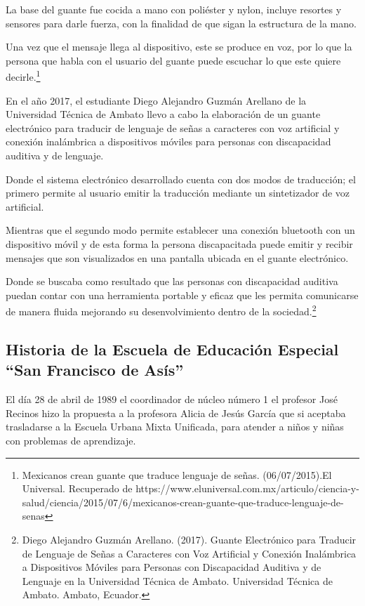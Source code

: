 \documentclass[12pt]{report}%
\begin{document}
La base del guante fue cocida a mano con poliéster y nylon, incluye resortes y sensores para darle fuerza, con la finalidad de que sigan la estructura de la mano. 

Una vez que el mensaje llega al dispositivo, este se produce en voz, por lo que la persona que habla con el usuario del guante puede escuchar lo que este quiere decirle.\footnote{Mexicanos crean guante que traduce lenguaje de señas. (06/07/2015).El Universal. Recuperado de https://www.eluniversal.com.mx/articulo/ciencia-y-salud/ciencia/2015/07/6/mexicanos-crean-guante-que-traduce-lenguaje-de-senas}

 En el año 2017, el estudiante Diego Alejandro Guzmán Arellano de la Universidad Técnica de Ambato llevo a cabo la elaboración de un guante electrónico para traducir de lenguaje de señas a caracteres con voz artificial y conexión inalámbrica a dispositivos móviles para personas con discapacidad auditiva y de lenguaje.

Donde el sistema electrónico desarrollado cuenta con dos modos de traducción; el primero permite al usuario emitir la traducción mediante un sintetizador de voz artificial.

Mientras que el segundo modo permite establecer una conexión bluetooth con un dispositivo móvil y de esta forma la persona discapacitada puede emitir y recibir mensajes que son visualizados en una pantalla ubicada en el guante electrónico.

Donde se buscaba como resultado que las personas con discapacidad auditiva puedan contar con una herramienta portable y eficaz que les permita comunicarse de manera fluida mejorando su desenvolvimiento dentro de la sociedad.\footnote{Diego Alejandro Guzmán Arellano. (2017). Guante Electrónico para Traducir de Lenguaje de Señas a Caracteres con Voz Artificial y Conexión Inalámbrica a Dispositivos Móviles para Personas con Discapacidad Auditiva y de Lenguaje en la Universidad Técnica de Ambato. Universidad Técnica de Ambato. Ambato, Ecuador.}
\newpage

\subsection{Historia de la Escuela de Educación Especial “San Francisco de Asís”}
El día 28 de abril de 1989 el coordinador de núcleo número 1 el profesor José Recinos hizo la propuesta a la profesora Alicia de Jesús García que si aceptaba trasladarse a la Escuela Urbana Mixta Unificada, para atender a niños y niñas con problemas de aprendizaje. 
\end{document}
